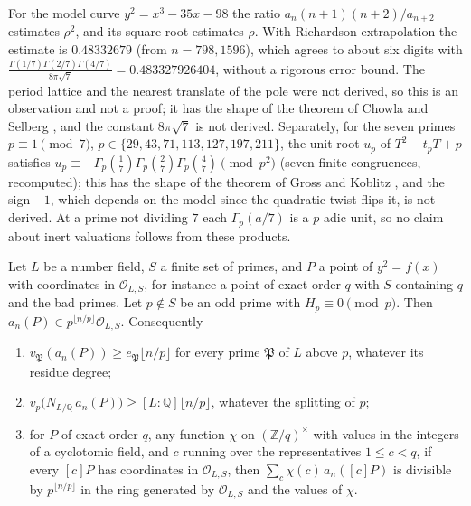 \begin{remark}[Gamma products for $d=7$, a numerical observation]\label{mql:prop:seven}
For the model curve $y^2=x^3-35x-98$ the ratio $a_n(n+1)(n+2)/a_{n+2}$ estimates $\rho^2$, and its square root estimates $\rho$. With Richardson extrapolation the estimate is $0.48332679$ (from $n=798,1596$), which agrees to about six digits with $\frac{\Gamma(1/7)\Gamma(2/7)\Gamma(4/7)}{8\pi\sqrt7}=0.483327926404$, without a rigorous error bound. The period lattice and the nearest translate of the pole were not derived, so this is an observation and not a proof; it has the shape of the theorem of Chowla and Selberg \cite{ChowlaSelberg67}, and the constant $8\pi\sqrt7$ is not derived. Separately, for the seven primes $p\equiv1\pmod7$, $p\in\{29,43,71,113,127,197,211\}$, the unit root $u_p$ of $T^2-t_pT+p$ satisfies $u_p\equiv-\Gamma_p(\frac17)\Gamma_p(\frac27)\Gamma_p(\frac47)\pmod{p^2}$ (seven finite congruences, recomputed); this has the shape of the theorem of Gross and Koblitz \cite{GrossKoblitz79}, and the sign $-1$, which depends on the model since the quadratic twist flips it, is not derived. At a prime not dividing $7$ each $\Gamma_p(a/7)$ is a $p$ adic unit, so no claim about inert valuations follows from these products.
\end{remark}

\begin{proposition}\label{mql:prop:uniform}
Let $L$ be a number field, $S$ a finite set of primes, and $P$ a point of $y^2=f(x)$ with coordinates in $\mathcal O_{L,S}$, for instance a point of exact order $q$ with $S$ containing $q$ and the bad primes. Let $p\notin S$ be an odd prime with $H_p\equiv0\pmod p$. Then $a_n(P)\in p^{\lfloor n/p\rfloor}\mathcal O_{L,S}$. Consequently
\begin{enumerate}
\item $v_{\mathfrak P}(a_n(P))\ge e_{\mathfrak P}\lfloor n/p\rfloor$ for every prime $\mathfrak P$ of $L$ above $p$, whatever its residue degree;
\item $v_p\bigl(N_{L/\mathbb Q}\,a_n(P)\bigr)\ge[L:\mathbb Q]\lfloor n/p\rfloor$, whatever the splitting of $p$;
\item for $P$ of exact order $q$, any function $\chi$ on $(\mathbb Z/q)^\times$ with values in the integers of a cyclotomic field, and $c$ running over the representatives $1\le c<q$, if every $[c]P$ has coordinates in $\mathcal O_{L,S}$, then $\sum_c\chi(c)\,a_n([c]P)$ is divisible by $p^{\lfloor n/p\rfloor}$ in the ring generated by $\mathcal O_{L,S}$ and the values of $\chi$.
\end{enumerate}
\end{proposition}

